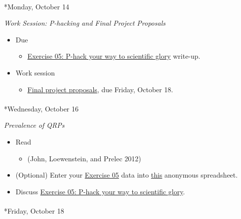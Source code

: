 \documentclass[
  letterpaper,
  DIV=11,
  numbers=noendperiod]{scrartcl}
\makeatletter
\let\oldparagraph\paragraph
\renewcommand{\paragraph}{
    \@ifstar
      \xxxParagraphStar
      \xxxParagraphNoStar
  }
\newcommand{\xxxParagraphStar}[1]{\oldparagraph*{#1}\mbox{}}
\newcommand{\xxxParagraphNoStar}[1]{\oldparagraph{#1}\mbox{}}
\providecommand{\tightlist}{%
  \setlength{\itemsep}{0pt}\setlength{\parskip}{0pt}}\usepackage{longtable,booktabs,array}
\makeatother
\begin{document}
\paragraph*{Monday, October 14}\label{monday-october-14}

\emph{Work Session: P-hacking and Final Project Proposals}

\begin{itemize}
\tightlist
\item
  {Due}

  \begin{itemize}
  \tightlist
  \item
    \href{exercises/ex05-p-hacking.qmd}{Exercise 05: P-hack your way to
    scientific glory} write-up.
  \end{itemize}
\item
  Work session

  \begin{itemize}
  \tightlist
  \item
    \href{exercises/final-project.qmd}{Final project proposals}, {due
    Friday, October 18}.
  \end{itemize}
\end{itemize}

\paragraph*{Wednesday, October 16}\label{wednesday-october-16}

\emph{Prevalence of QRPs}

\begin{itemize}
\tightlist
\item
  Read

  \begin{itemize}
  \tightlist
  \item
    (John, Loewenstein, and Prelec 2012)
  \end{itemize}
\item
  (Optional) Enter your \href{exercises/ex05-p-hacking.qmd}{Exercise 05}
  data into
  \href{https://docs.google.com/spreadsheets/d/1JI_Qih4wCzUrYTQYE3dpvVx2C7GdzfUZq0a3QhqQyeE/edit?usp=sharing}{this}
  anonymous spreadsheet.
\item
  Discuss \href{exercises/ex05-p-hacking.qmd}{Exercise 05: P-hack your
  way to scientific glory}.
\end{itemize}

\paragraph*{Friday, October 18}\label{friday-october-18}
\end{document}
